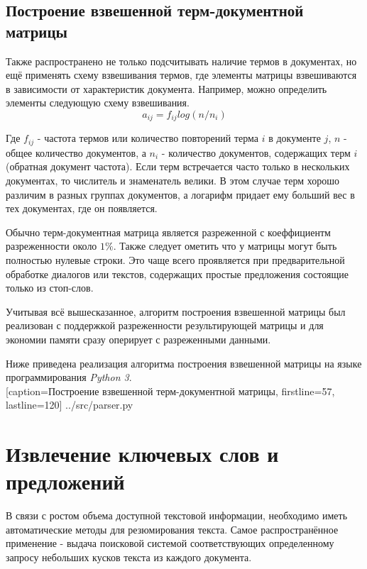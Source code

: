\subsection{Построение взвешенной терм-документной матрицы}

Также распространено не только подсчитывать наличие термов в документах,
но ещё применять схему взвешивания термов, где элементы матрицы взвешиваются в зависимости от характеристик документа.
Например, можно определить элементы следующую схему взвешивания.
\begin{equation}
  a_{ij} = f_{ij} log(n /n_i)
\end{equation}

Где $f_{ij}$ - частота термов или количество повторений терма $i$ в документе $j$, $n$ - общее количество документов,  а $n_i$ - количество документов, содержащих терм $i$ (обратная документ частота).
Если терм встречается часто только в нескольких документах, то числитель и знаменатель велики.
В этом случае терм хорошо различим в разных группах документов, а логарифм придает ему больший вес в тех документах, где он появляется.

Обычно терм-документная матрица является разреженной с коеффициентм разреженности около $1\%$.
Также следует ометить что у матрицы могут быть полностью нулевые строки.
Это чаще всего проявляется при предварительной обработке диалогов или текстов,
содержащих простые предложения состоящие только из стоп-слов.

Учитывая всё вышесказанное, алгоритм построения взвешенной матрицы
был реализован с поддержкой разреженности результирующей матрицы
и для экономии памяти сразу оперирует с разреженными данными.

\newpage

Ниже приведена реализация алгоритма построения взвешенной матрицы на языке программирования \textit{Python 3}.
\\


  [caption=Построение взвешенной терм-документной матрицы, firstline=57, lastline=120]
  {../src/parser.py}




\newpage




\section{Извлечение ключевых слов и предложений}

В связи с ростом объема доступной текстовой информации, необходимо иметь автоматические методы для резюмирования текста.
Самое распространённое применение - выдача поисковой системой соответствующих определенному запросу небольших кусков текста из каждого документа.

